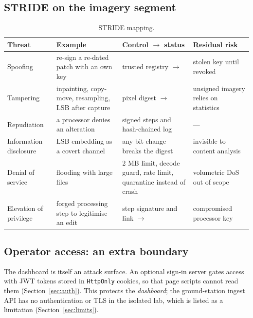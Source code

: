 \subsection{STRIDE on the imagery segment}
\begin{table}[!htbp]
\centering\small
\begin{tabularx}{\textwidth}{|L{2.4cm}|Y|Y|L{3.1cm}|}
\hline
\textbf{Threat} & \textbf{Example} & \textbf{Control $\to$ status} & \textbf{Residual risk}\\
\hline
Spoofing & re-sign a re-dated patch with an own key & trusted registry $\to$  & stolen key until revoked\\
\hline
Tampering & inpainting, copy-move, resampling, LSB after capture & pixel digest $\to$  & unsigned imagery relies on statistics\\
\hline
Repudiation & a processor denies an alteration & signed steps and hash-chained log & ---\\
\hline
Information disclosure & LSB embedding as a covert channel & any bit change breaks the digest & invisible to content analysis\\
\hline
Denial of service & flooding with large files & 2 MB limit, decode guard, rate limit, quarantine instead of crash & volumetric DoS out of scope\\
\hline
Elevation of privilege & forged processing step to legitimise an edit & step signature and link $\to$  & compromised processor key\\
\hline
\end{tabularx}
\caption{STRIDE mapping.}
\end{table}

\subsection{Operator access: an extra boundary}
The dashboard is itself an attack surface. An optional sign-in server gates access with JWT tokens \cite{rfc7519} stored in \texttt{HttpOnly} cookies, so that page scripts cannot read them (Section~\ref{sec:auth}). This protects the \emph{dashboard}; the ground-station ingest API has no authentication or TLS in the isolated lab, which is listed as a limitation (Section~\ref{sec:limits}).
